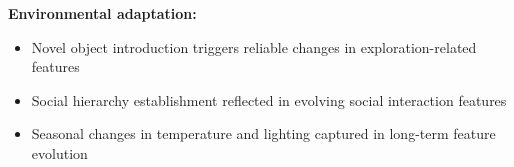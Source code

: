 \textbf{Environmental adaptation:}
\begin{itemize}
\item Novel object introduction triggers reliable changes in exploration-related features
\item Social hierarchy establishment reflected in evolving social interaction features
\item Seasonal changes in temperature and lighting captured in long-term feature evolution
\end{itemize}

